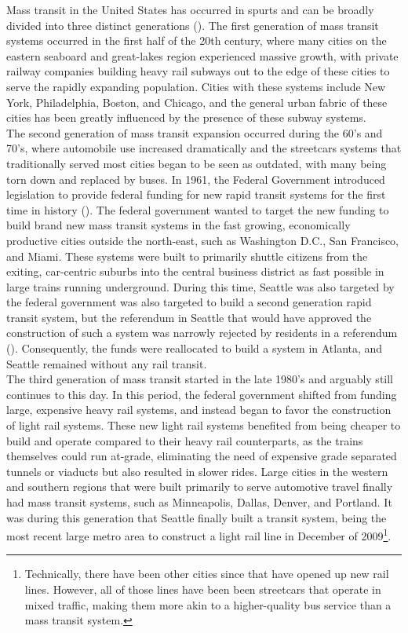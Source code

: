 \documentclass[A4paper,12pt]{article}
\begin{document}
Mass transit in the United States has occurred in spurts and can be broadly divided into three distinct generations (\cite{skinner_second_1980}). The first generation of mass transit systems occurred in the first half of the 20th century, where many cities on the eastern seaboard and great-lakes region experienced massive growth, with private railway companies building heavy rail subways out to the edge of these cities to serve the rapidly expanding population. Cities with these systems include New York, Philadelphia, Boston, and Chicago, and the general urban fabric of these cities has been greatly influenced by the presence of these subway systems.\\

The second generation of mass transit expansion occurred during the 60's and 70's, where automobile use increased dramatically and the streetcars systems that traditionally served most cities began to be seen as outdated, with many being torn down and replaced by buses. In 1961, the Federal Government introduced legislation to provide federal funding for new rapid transit systems for the first time in history (\cite{federal_transit_administration_brief_2020}). The federal government wanted to target the new funding to build brand new mass transit systems in the fast growing, economically productive cities outside the north-east, such as Washington D.C., San Francisco, and Miami. These systems were built to primarily shuttle citizens from the exiting, car-centric suburbs into the central business district as fast possible in large trains running underground. During this time, Seattle was also targeted by the federal government was also targeted to build a second generation rapid transit system, but the referendum in Seattle that would have approved the construction of such a system was narrowly rejected by residents in a referendum (\cite{cohen_how_2016}). Consequently, the funds were reallocated to build a system in Atlanta, and Seattle remained without any rail transit. \\

The third generation of mass transit started in the late 1980's and arguably still continues to this day. In this period, the federal government shifted from funding large, expensive heavy rail systems, and instead began to favor the construction of light rail systems. These new light rail systems benefited from being cheaper to build and operate compared to their heavy rail counterparts, as the trains themselves could run at-grade, eliminating the need of expensive grade separated tunnels or viaducts but also resulted in slower rides. Large cities in the western and southern regions that were built primarily to serve automotive travel finally had mass transit systems, such as Minneapolis, Dallas, Denver, and Portland. It was during this generation that Seattle finally built a transit system, being the most recent large metro area to construct a light rail line in December of 2009\footnote{Technically, there have been other cities since that have opened up new rail lines. However, all of those lines have been been streetcars that operate in mixed traffic, making them more akin to a higher-quality bus service than a mass transit system.}. \\
\end{document}
